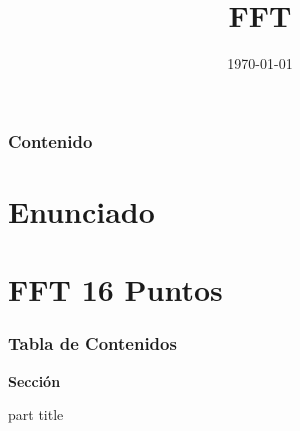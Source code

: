 \documentclass[t]{beamer}
\title[FFT]{FFT }
\date{\today}
\begin{document}
\begin{frame}
\maketitle
\end{frame}

\section[Outline]{}
\begin{frame}
       \frametitle{Contenido}	
        \vspace*{0.5cm}
       \tiny{\tableofcontents}
\end{frame}



\section{Enunciado}

\section{FFT 16 Puntos}
\begin{frame}
  \frametitle{\textbf{Tabla de Contenidos}}
  \begin{center}
    {\vspace{-1.5cm}\Large \textbf{Sección \thesection}\vspace{0.5cm}}
    \begin{beamercolorbox}[
      sep=8pt,center]{part title}
      \textbf{\insertsection}
    \end{beamercolorbox}
  \end{center}
\end{frame}

\section{}
\end{document}
